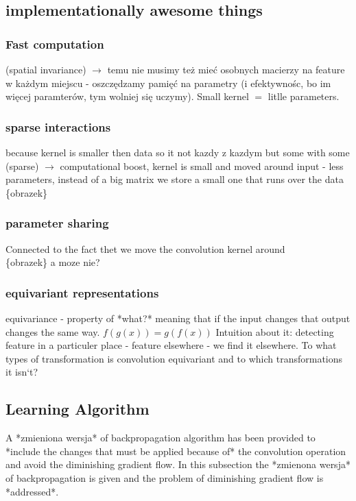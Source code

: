 \documentclass[a4paper,10pt]{report}
\begin{document}
      \subsection{implementationally awesome things} %
      
	\subsubsection{Fast computation}
	  (spatial invariance) $\rightarrow$ temu nie musimy też mieć osobnych macierzy na feature w każdym miejscu - oszczędzamy pamięć na parametry (i efektywnośc, bo im więcej paramterów, tym wolniej się uczymy). Small kernel $=$ litlle parameters.
	
	\subsubsection{sparse interactions} %
	  because kernel is smaller then data so it not kazdy z kazdym but some with some (sparse) $\rightarrow$ computational boost, kernel is small and moved around input - less parameters, instead of a big matrix we store a small one that runs over the data\\
	  
	  \{obrazek\} %
	  
	\subsubsection{parameter sharing} %
	  Connected to the fact thet we move the convolution kernel around \\
	  
	  \{obrazek\} a moze nie?
	  
	\subsubsection{equivariant representations} %
	  equivariance - property of *what?* meaning that if the input changes that output changes the same way. $f(g(x)) = g(f(x))$ Intuition about it: detecting feature in a particuler place - feature elsewhere - we find it elsewhere. To what types of transformation is convolution equivariant and to which transformations it isn`t?
      
      \subsection{Learning Algorithm} %
	A *zmieniona wersja* of backpropagation algorithm has been provided to *include the changes that must be applied because of* the convolution operation and avoid the diminishing gradient flow. In this subsection the *zmienona wersja* of backpropagation is given and the problem of diminishing gradient flow is *addressed*.
	
\end{document}
